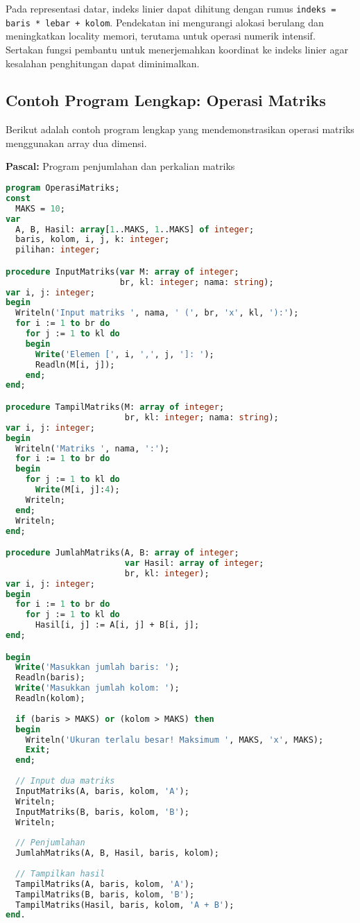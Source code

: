 \documentclass[../main.tex]{subfiles}
\begin{document}
Pada representasi datar, indeks linier dapat dihitung dengan rumus \texttt{indeks = baris * lebar + kolom}. Pendekatan ini mengurangi alokasi berulang dan meningkatkan locality memori, terutama untuk operasi numerik intensif. Sertakan fungsi pembantu untuk menerjemahkan koordinat ke indeks linier agar kesalahan penghitungan dapat diminimalkan.

\subsection{Contoh Program Lengkap: Operasi Matriks}

Berikut adalah contoh program lengkap yang mendemonstrasikan operasi matriks menggunakan array dua dimensi.

\textbf{Pascal:} Program penjumlahan dan perkalian matriks
\begin{lstlisting}[language=Pascal, caption={Program operasi matriks di Pascal}]
program OperasiMatriks;
const
  MAKS = 10;
var
  A, B, Hasil: array[1..MAKS, 1..MAKS] of integer;
  baris, kolom, i, j, k: integer;
  pilihan: integer;

procedure InputMatriks(var M: array of integer; 
                       br, kl: integer; nama: string);
var i, j: integer;
begin
  Writeln('Input matriks ', nama, ' (', br, 'x', kl, '):');
  for i := 1 to br do
    for j := 1 to kl do
    begin
      Write('Elemen [', i, ',', j, ']: ');
      Readln(M[i, j]);
    end;
end;

procedure TampilMatriks(M: array of integer; 
                        br, kl: integer; nama: string);
var i, j: integer;
begin
  Writeln('Matriks ', nama, ':');
  for i := 1 to br do
  begin
    for j := 1 to kl do
      Write(M[i, j]:4);
    Writeln;
  end;
  Writeln;
end;

procedure JumlahMatriks(A, B: array of integer;
                        var Hasil: array of integer;
                        br, kl: integer);
var i, j: integer;
begin
  for i := 1 to br do
    for j := 1 to kl do
      Hasil[i, j] := A[i, j] + B[i, j];
end;

begin
  Write('Masukkan jumlah baris: ');
  Readln(baris);
  Write('Masukkan jumlah kolom: ');
  Readln(kolom);
  
  if (baris > MAKS) or (kolom > MAKS) then
  begin
    Writeln('Ukuran terlalu besar! Maksimum ', MAKS, 'x', MAKS);
    Exit;
  end;
  
  // Input dua matriks
  InputMatriks(A, baris, kolom, 'A');
  Writeln;
  InputMatriks(B, baris, kolom, 'B');
  Writeln;
  
  // Penjumlahan
  JumlahMatriks(A, B, Hasil, baris, kolom);
  
  // Tampilkan hasil
  TampilMatriks(A, baris, kolom, 'A');
  TampilMatriks(B, baris, kolom, 'B');
  TampilMatriks(Hasil, baris, kolom, 'A + B');
end.
\end{lstlisting}
\end{document}
